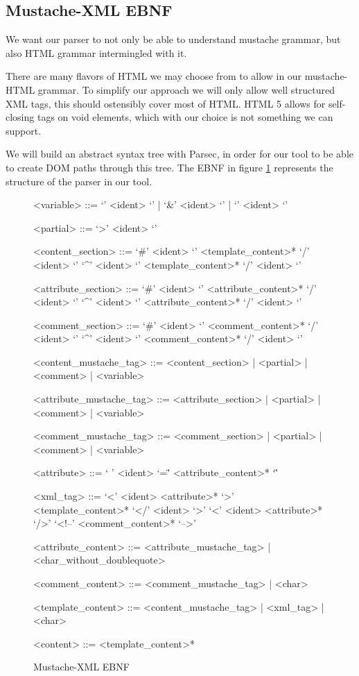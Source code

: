 \subsection{Mustache-XML EBNF}
We want our parser to not only be able to understand mustache grammar, but also
HTML grammar intermingled with it.

There are many flavors of HTML we may choose from to allow in our
mustache-HTML grammar. To simplify our approach we will only allow well
structured XML tags, this should ostensibly cover most of HTML.
HTML 5 allows for self-closing tags on void elements, which with our choice is
not something we can support.

We will build an abstract syntax tree with Parsec, in order for our tool to be
able to create DOM paths through this tree. The EBNF in figure
\ref{fig:mustache-xml.ebnf} represents the structure of the parser in our tool.

\begin{figure}
	\centering
	\caption{Mustache-XML EBNF}
	\label{fig:mustache-xml.ebnf}
	\setlength{\grammarindent}{4.2cm}
	\begin{grammar}
<variable> ::= `{{{' <ident> `}}}' | `{{&' <ident> `}}' | `{{' <ident> `}}'

<partial> ::= `{{>' <ident> `}}'

<content\_section> ::= `{{#' <ident> `}}' <template\_content>* `{{/' <ident> `}}'
                  \alt `{{^' <ident> `}}' <template\_content>* `{{/' <ident> `}}'

<attribute\_section> ::= `{{#' <ident> `}}' <attribute\_content>* `{{/' <ident> `}}'
                    \alt `{{^' <ident> `}}' <attribute\_content>* `{{/' <ident> `}}'

<comment\_section> ::= `{{\#' <ident> `}}' <comment\_content>* `{{/' <ident> `}}'
                  \alt `{{^' <ident> `}}' <comment\_content>* `{{/' <ident> `}}'

<content\_mustache\_tag> ::= <content\_section> | <partial> | <comment> | <variable>

<attribute\_mustache\_tag> ::= <attribute\_section> | <partial> | <comment> | <variable>

<comment\_mustache\_tag> ::= <comment\_section> | <partial> | <comment> | <variable>

<attribute> ::= ` ' <ident> `=\"' <attribute\_content>* `\"' 

<xml\_tag> ::= `<' <ident> <attribute>* `>' <template\_content>* `</' <ident> `>'
          \alt `<' <ident> <attribute>* `/>'
          \alt `<!--' <comment\_content>* `-->'

<attribute\_content> ::= <attribute\_mustache\_tag> | <char\_without\_doublequote>

<comment\_content> ::= <comment\_mustache\_tag> | <char>

<template\_content> ::= <content\_mustache\_tag> | <xml\_tag> | <char>

<content> ::= <template\_content>*
	\end{grammar}
\end{figure}

